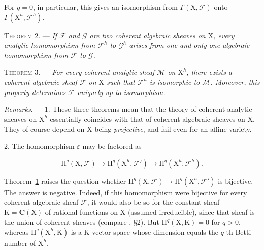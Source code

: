 For $q=0$, in particular, this gives an isomorphism from $\Gamma(\mathrm{X},\mathcal{F})$ onto $\Gamma(\mathrm{X}^h,\mathcal{F}^h)$.

\textsc{Theorem 2}. --- \emph{If $\mathcal{F}$ and $\mathcal{G}$ are two coherent algebraic sheaves on $\mathrm{X}$, every analytic homomorphism from $\mathcal{F}^h$ to $\mathcal{G}^h$ arises from one and only one algebraic homomorphism from $\mathcal{F}$ to $\mathcal{G}$.}

\textsc{Theorem 3}. --- \emph{For every coherent analytic sheaf $\mathcal{M}$ on $\mathrm{X}^h$, there exists a coherent algebraic sheaf $\mathcal{F}$ on $\mathrm{X}$ such that $\mathcal{F}^h$ is isomorphic to $\mathcal{M}$. Moreover, this property determines $\mathcal{F}$ uniquely up to isomorphism.}

\emph{Remarks}. --- 1. These three theorems mean that the theory of coherent analytic sheaves on $\mathrm{X}^h$ essentially coincides with that of coherent algebraic sheaves on $\mathrm{X}$. They of course depend on $\mathrm{X}$ being \emph{projective}, and fail even for an affine variety.

2. The homomorphism $\varepsilon$ may be factored as

\begin{equation*}
\mathrm{H}^q(\mathrm{X},\mathcal{F})
\longrightarrow
\mathrm{H}^q(\mathrm{X}^h,\mathcal{F}')
\longrightarrow
\mathrm{H}^q(\mathrm{X}^h,\mathcal{F}^h).
\end{equation*}

Theorem~\hyperref[gaga:thm:1]{1} raises the question whether $\mathrm{H}^q(\mathrm{X},\mathcal{F})\to\mathrm{H}^q(\mathrm{X}^h,\mathcal{F}')$ is bijective. The answer is negative. Indeed, if this homomorphism were bijective for every coherent algebraic sheaf $\mathcal{F}$, it would also be so for the constant sheaf $\mathrm{K}=\mathbf{C}(\mathrm{X})$ of rational functions on $\mathrm{X}$ (assumed irreducible), since that sheaf is the union of coherent sheaves (compare , \S 2). But $\mathrm{H}^q(\mathrm{X},\mathrm{K})=0$ for $q>0$, whereas $\mathrm{H}^q(\mathrm{X}^h,\mathrm{K})$ is a $\mathrm{K}$-vector space whose dimension equals the $q$-th Betti number of $\mathrm{X}^h$.
